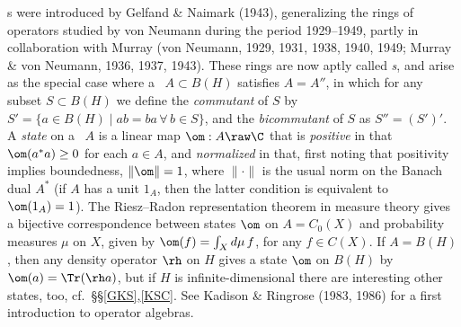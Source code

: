 \documentclass[12pt]{article}
\begin{document}
\ca s were introduced by  Gelfand \& Naimark (1943), generalizing the rings of operators studied by von Neumann  during the period 1929--1949, partly in collaboration with Murray 
 (von Neumann, 1929, 1931, 1938, 1940, 1949; Murray \& von Neumann, 1936, 1937, 1943). These rings 
 are now aptly called \emph{\vna s}, and arise as the special case where a \ca\ $A\subset B(H)$ satisfies $A=A''$, in which for any subset $S\subset B(H)$ we define the \emph{commutant} of $S$ by $S'=\{a\in B(H)\mid ab=ba\,\forall\, b\in S\}$, and
the \emph{bicommutant} of $S$ as  $S''=(S')'$. A \emph{state} on a \ca\ $A$  is a linear map $\om:A\raw\C$ that is \emph{positive} in that $\om(a^*a)\geq 0$ for each $a\in A$, and \emph{normalized} in that, first noting that positivity implies boundedness, $\|\om\|=1$, where $\|\cdot\|$ is the usual norm on the Banach dual $A^*$ (if $A$ has a unit $1_A$, then the latter condition is equivalent to
$\om(1_A)=1$). The Riesz--Radon representation theorem in measure theory gives a bijective correspondence between states
 $\om$ on $A=C_0(X)$ and  probability measures $\mu$ on $X$,  given by $\om(f)=\int_X d\mu\, f$, for any  $f\in C(X)$.
If $A=B(H)$, then any density operator $\rh$ on $H$ gives a state $\om$ on $B(H)$ by $\om(a)=\Tr(\rh a)$, but if $H$ is infinite-dimensional there are interesting other states, too, cf.\ \S\S\ref{GKS},\ref{KSC}.
 See Kadison \& Ringrose (1983, 1986) for a first introduction to operator algebras.
\end{document}
